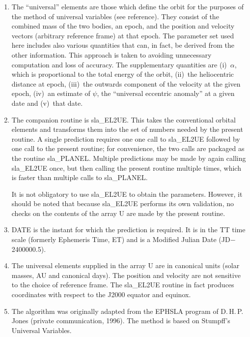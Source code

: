 \documentclass[11pt,twoside]{article}
\begin{document}
{
 \begin{enumerate}
  \setlength{\parskip}{\medskipamount}
  \item The ``universal'' elements are those which define the orbit for the
        purposes of the method of universal variables (see reference).
        They consist of the combined mass of the two bodies, an epoch,
        and the position and velocity vectors (arbitrary reference frame)
        at that epoch.  The parameter set used here includes also various
        quantities that can, in fact, be derived from the other
        information.  This approach is taken to avoiding unnecessary
        computation and loss of accuracy.  The supplementary quantities
        are (i)~$\alpha$, which is proportional to the total energy of the
        orbit, (ii)~the heliocentric distance at epoch,
        (iii)~the outwards component of the velocity at the given epoch,
        (iv)~an estimate of $\psi$, the ``universal eccentric anomaly'' at a
        given date and (v)~that date.
  \item The companion routine is sla\_EL2UE.  This takes the conventional
        orbital elements and transforms them into the set of numbers
        needed by the present routine.  A single prediction requires one
        one call to sla\_EL2UE followed by one call to the present routine;
        for convenience, the two calls are packaged as the routine
        sla\_PLANEL.  Multiple predictions may be made by again
        calling sla\_EL2UE once, but then calling the present routine
        multiple times, which is faster than multiple calls to sla\_PLANEL.

        It is not obligatory to use sla\_EL2UE to obtain the parameters.
        However, it should be noted that because sla\_EL2UE performs its
        own validation, no checks on the contents of the array U are made
        by the present routine.
  \item DATE is the instant for which the prediction is required.  It is
        in the TT time scale (formerly Ephemeris Time, ET) and is a
        Modified Julian Date (JD$-$2400000.5).
  \item The universal elements supplied in the array U are in canonical
        units (solar masses, AU and canonical days).  The position and
        velocity are not sensitive to the choice of reference frame.  The
        sla\_EL2UE routine in fact produces coordinates with respect to the
        J2000 equator and equinox.
  \item The algorithm was originally adapted from the EPHSLA program of
        D.\,H.\,P.\,Jones (private communication, 1996).  The method
        is based on Stumpff's Universal Variables.
 \end{enumerate}
}
\end{document}
